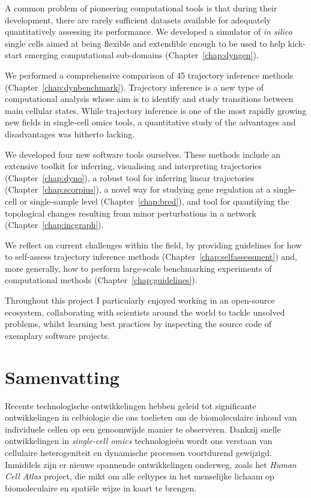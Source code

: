 A common problem of pioneering computational tools is that during their development, there are rarely sufficient datasets available for adequately quantitatively assessing its performance. We developed a simulator of \textit{in silico} single cells aimed at being flexible and extendible enough to be used to help kick-start emerging computational sub-domains (Chapter~\ref{chap:dyngen}).

We performed a comprehensive comparison of 45 trajectory inference methods (Chapter~\ref{chap:dynbenchmark}). Trajectory inference is a new type of computational analysis whose aim is to identify and study transitions between main cellular states. While trajectory inference is one of the most rapidly growing new fields in single-cell omics tools, a quantitative study of the advantages and disadvantages was hitherto lacking.

We developed four new software tools ourselves. These methods include an extensive toolkit for inferring, visualising and interpreting trajectories (Chapter~\ref{chap:dyno}), a robust tool for inferring linear trajectories (Chapter~\ref{chap:scorpius}), a novel way for studying gene regulation at a single-cell or single-sample level (Chapter~\ref{chap:bred}), and tool for quantifying the topological changes resulting from minor perturbations in a network (Chapter~\ref{chap:incgraph}).

We reflect on current challenges within the field, by providing guidelines for how to self-assess trajectory inference methods (Chapter~\ref{chap:selfassessment}) and, more generally, how to perform large-scale benchmarking experiments of computational methods (Chapter~\ref{chap:guidelines}).

Throughout this project I particularly enjoyed working in an open-source ecosystem, collaborating with scientists around the world to tackle unsolved problems, whilst learning best practices by inspecting the source code of exemplary software projects. 


\chapter*{Samenvatting}
\vspace{-4em}
Recente technologische ontwikkelingen hebben geleid tot significante ontwikkelingen in celbiologie die ons toelieten om de biomoleculaire inhoud van individuele cellen op een genoomwijde manier te observeren. Dankzij snelle ontwikkelingen in \textit{single-cell omics} technologieën wordt ons verstaan van cellulaire heterogeniteit en dynamische processen voortdurend gewijzigd. Inmiddels zijn er nieuwe spannende ontwikkelingen onderweg, zoals het \textit{Human Cell Atlas} project, die mikt om alle celtypes in het menselijke lichaam op biomoleculaire en spatiële wijze in kaart te brengen.

